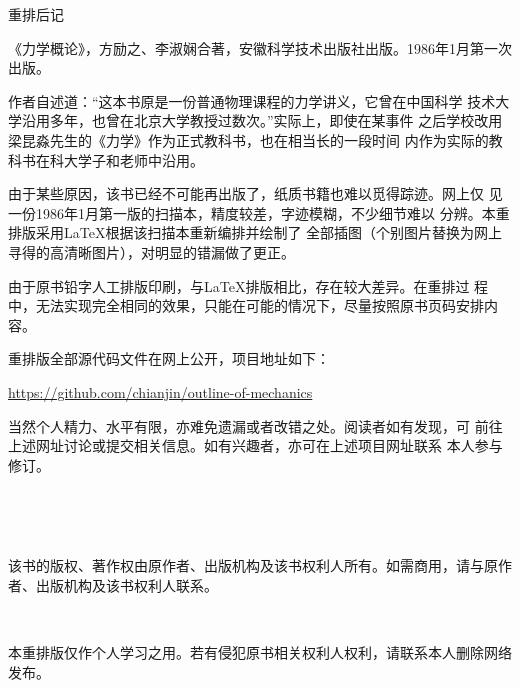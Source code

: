 \clearpage
\pagestyle{empty}
\setcounter{page}{1}
\label{afterword}
\begin{center}
  \xbsong 重\hspace{0.333em}排\hspace{0.333em}后\hspace{0.333em}记
\end{center}
\vspace{1em}



《力学概论》，方励之、李淑娴合著，安徽科学技术出版社出版。1986年1月第一次出版。

作者自述道：“这本书原是一份普通物理课程的力学讲义，它曾在中国科学
技术大学沿用多年，也曾在北京大学教授过数次。”实际上，即使在某事件
之后学校改用梁昆淼先生的《力学》作为正式教科书，也在相当长的一段时间
内作为实际的教科书在科大学子和老师中沿用。

由于某些原因，该书已经不可能再出版了，纸质书籍也难以觅得踪迹。网上仅
见一份1986年1月第一版的扫描本，精度较差，字迹模糊，不少细节难以
分辨。本重排版采用\LaTeX 根据该扫描本重新编排并绘制了
全部插图（个别图片替换为网上寻得的高清晰图片），对明显的错漏做了更正。

由于原书铅字人工排版印刷，与\LaTeX 排版相比，存在较大差异。在重排过
程中，无法实现完全相同的效果，只能在可能的情况下，尽量按照原书页码安排内容。

重排版全部源代码文件在网上公开，项目地址如下：
\begin{center}
  \href{https://github.com/chianjin/outline-of-mechanics}{https://github.com/chianjin/outline-of-mechanics}
\end{center}

当然个人精力、水平有限，亦难免遗漏或者改错之处。阅读者如有发现，可
前往上述网址讨论或提交相关信息。如有兴趣者，亦可在上述项目网址联系
本人参与修订。

\clearpage
\centering
~\vspace{2\baselineskip}
\begin{minipage}[c]{0.7\linewidth}
  \indent
  \label{tips}
  \heiti {}
  \begin{center}
  \end{center}
  \normalsize
  \vspace{1em}

  ~

  \hspace{2em}该书的版权、著作权由原作者、出版机构及该书权利人所有。如需商用，请与原作者、出版机构及该书权利人联系。

  ~

  \hspace{2em}本重排版仅作个人学习之用。若有侵犯原书相关权利人权利，请联系本人删除网络发布。
\end{minipage}

